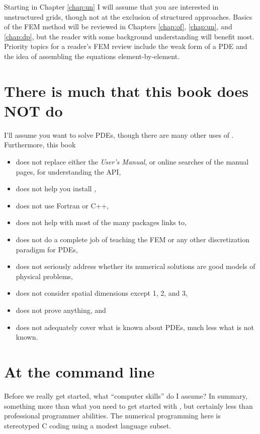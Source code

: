 Starting in Chapter \ref{chap:un} I will assume that you are interested in unstructured grids, though not at the exclusion of structured approaches.  Basics of the FEM method will be reviewed in Chapters \ref{chap:of}, \ref{chap:un}, and \ref{chap:dp}, but the reader with some background understanding will benefit most.  Priority topics for a reader's FEM review include the weak form of a PDE and the idea of assembling the equations element-by-element.


\section{There is much that this book does NOT do}

I'll assume you want to solve PDEs, though there are many other uses of \PETSc.  Furthermore, this book\begin{itemize}
\item  does not replace either the \PETSc \emph{User's Manual}, or online searches of the \PETSc manual pages, for understanding the API,
\item  does not help you install \PETSc,
\item  does not use Fortran or C++,
\item  does not help with most of the many packages \PETSc links to,
\item  does not do a complete job of teaching the FEM or any other discretization paradigm for PDEs,
\item  does not seriously address whether its numerical solutions are good models of physical problems,
\item  does not consider spatial dimensions except 1, 2, and 3,
\item  does not prove anything, and
\item  does not adequately cover what is known about PDEs, much less what is not known.
\end{itemize}


\section{At the command line}

Before we really get started, what ``computer skills'' do I assume?  In summary, something more than what you need to get started with \Matlab, but certainly less than professional programmer abilities.  The numerical programming here is stereotyped C coding using a modest language subset.

